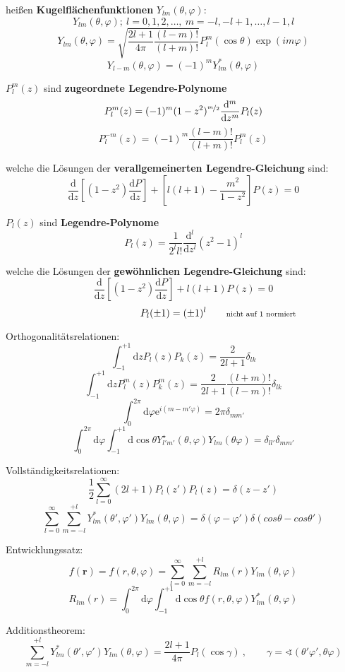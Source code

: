 \documentclass[titlepage,11pt,a4paper,ngerman]{report}
\newcommand{\vphi}{\varphi}
\newcommand{\dd}{\mathrm{d}}
\renewcommand{\vec}[1]{\boldsymbol{#1}}
\begin{document}
heißen \textbf{Kugelflächenfunktionen} $Y_{lm}(\theta,\vphi)$:
\[Y_{lm}(\theta,\vphi);\ l=0,1,2,\ldots,\ m=-l,-l+1,\ldots,l-1,l\]
\[Y_{lm}(\theta,\vphi)=\sqrt{\frac{2l+1}{4\pi}\frac{(l-m)!}{(l+m)!}}P_l^m(\cos\theta)\exp(im\vphi)\]
\[Y_{l-m}(\theta,\vphi)=(-1)^mY_{lm}^*(\theta,\vphi)\]

\noindent
$P_l^m(z)$ sind \textbf{zugeordnete Legendre-Polynome}
\[P_l^m(z)=(-1)^m(1-z^2)^{\nicefrac{m}{2}}\frac{\mathrm{d}^m}{\mathrm{d}z^m}P_l(z)\]
\[P_l^{-m}(z)=(-1)^m\frac{(l-m)!}{(l+m)!}P_l^m(z)\]

welche die Lösungen der  \textbf{verallgemeinerten Legendre-Gleichung} sind:
\[\frac{\dd}{\dd z}\left[(1-z^2)\frac{\dd P}{\dd z}\right]+\left[l(l+1)-\frac{m^2}{1-z^2}\right]P(z)=0\]

\noindent
$P_l(z)$ sind \textbf{Legendre-Polynome}
\[P_l(z)=\frac{1}{2^ll!}\frac{\dd^l}{\dd z^l}(z^2-1)^l\]

welche die Lösungen der  \textbf{gewöhnlichen Legendre-Gleichung} sind:
\[\frac{\dd}{\dd z}\left[(1-z^2)\frac{\dd P}{\dd z}\right]+l(l+1)P(z)=0\]
\[P_l(\pm1)=(\pm1)^l\qquad\rlap{\scriptsize{nicht auf 1 normiert}}\]

\pagebreak
\noindent
Orthogonalitätsrelationen:
\[\int_{-1}^{+1}\dd zP_l(z)P_k(z)=\frac{2}{2l+1}\delta_{lk}\]
\[\int_{-1}^{+1}\dd zP_l^m(z)P_k^m(z)=\frac{2}{2l+1}\frac{(l+m)!}{(l-m)!}\delta_{lk}\]
\[\int_0^{2\pi}\dd\vphi \mathrm{e}^{i(m-m'\vphi)}=2\pi\delta_{mm'}\]
\[\int_0^{2\pi}\dd\varphi\int_{-1}^{+1}\dd\cos\theta Y_{l'm'}^\star(\theta,\vphi)Y_{lm}(\theta\vphi)=\delta_{ll'}\delta_{mm'}\]

\noindent
Vollständigkeitsrelationen:
\[\frac{1}{2}\sum_{l=0}^\infty(2l+1)P_l(z')P_l(z)=\delta(z-z')\]
\[\sum_{l=0}^{\infty}\sum_{m=-l}^{+l}Y_{lm}^*(\theta',\varphi')Y_{lm}(\theta,\varphi)=\delta(\varphi-\varphi')\delta(cos\theta-cos\theta')\]

\noindent
Entwicklungssatz:
\[f(\vec{r})=f(r,\theta,\varphi)=\sum_{l=0}^{\infty}\sum_{m=-l}^{+l}R_{lm}(r)Y_{lm}(\theta,\varphi)\]
\[R_{lm}(r)=\int_0^{2\pi}\dd\varphi\int_{-1}^{+1}\dd \cos\theta f(r,\theta,\varphi)Y_{lm}^*(\theta,\varphi)\]

\noindent
Additionstheorem:
\[\sum_{m=-l}^{+l}Y_{lm}^*(\theta',\varphi')Y_{lm}(\theta,\varphi)=\frac{2l+1}{4\pi}P_l(\cos\gamma)\ ,\qquad\gamma=\sphericalangle(\theta'\varphi',\theta\varphi)\]
\end{document}
